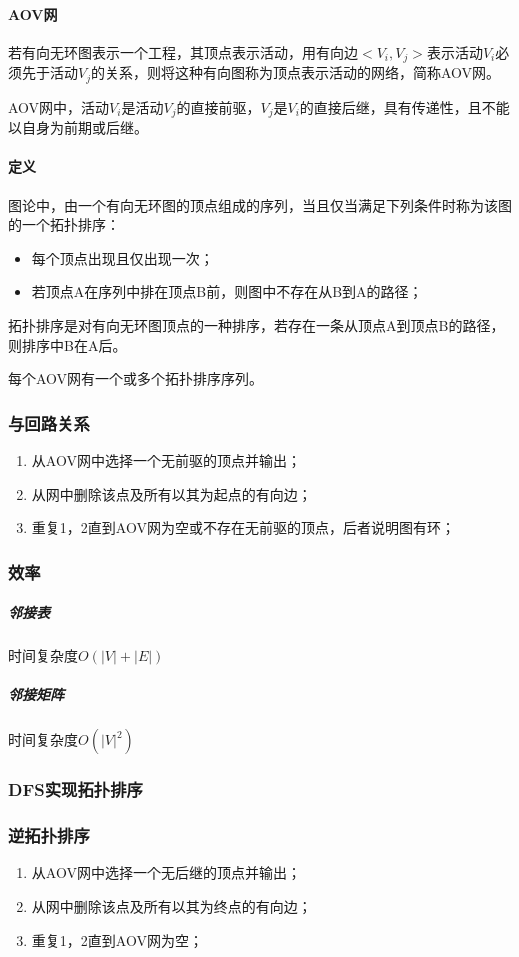 \paragraph{AOV网}
若有向无环图表示一个工程，其顶点表示活动，用有向边\(<V_i, V_j>\)表示活动\(V_i\)必须先于活动\(V_j\)的关系，则将这种有向图称为顶点表示活动的网络，简称AOV网。

AOV网中，活动\(V_i\)是活动\(V_j\)的直接前驱，\(V_j\)是\(V_i\)的直接后继，具有传递性，且不能以自身为前期或后继。

\paragraph{定义}
图论中，由一个有向无环图的顶点组成的序列，当且仅当满足下列条件时称为该图的一个拓扑排序：
\begin{itemize}
    \item 每个顶点出现且仅出现一次；
    \item 若顶点A在序列中排在顶点B前，则图中不存在从B到A的路径；
\end{itemize}
拓扑排序是对有向无环图顶点的一种排序，若存在一条从顶点A到顶点B的路径，则排序中B在A后。

每个AOV网有一个或多个拓扑排序序列。

\subsubsection{与回路关系}

\begin{enumerate}
    \item 从AOV网中选择一个无前驱的顶点并输出；
    \item 从网中删除该点及所有以其为起点的有向边；
    \item 重复1，2直到AOV网为空或不存在无前驱的顶点，后者说明图有环；
\end{enumerate}

\subsubsection{效率}

\subparagraph{邻接表}
时间复杂度\(O(|V| + |E|)\)

\subparagraph{邻接矩阵}
时间复杂度\(O(|V|^2)\)

\subsubsection{DFS实现拓扑排序}

\subsubsection{逆拓扑排序}
\begin{enumerate}
    \item 从AOV网中选择一个无后继的顶点并输出；
    \item 从网中删除该点及所有以其为终点的有向边；
    \item 重复1，2直到AOV网为空；
\end{enumerate}



